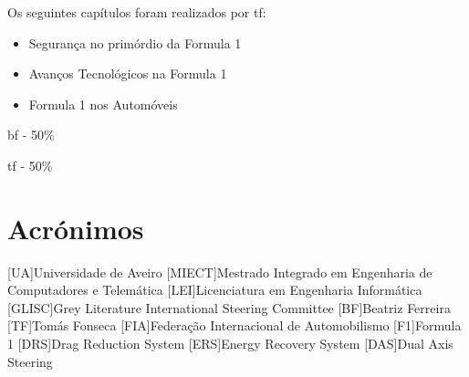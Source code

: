 \documentclass{report}
\begin{document}
Os seguintes capítulos foram realizados por \ac{tf}:
\begin{itemize}
\item Segurança no primórdio da Formula 1
\item Avanços Tecnológicos na Formula 1
\item Formula 1 nos Automóveis\\[0.5cm]
\end{itemize}

\ac{bf} - 50\%


\ac{tf} - 50\%


\chapter*{Acrónimos}
\begin{acronym}
[UA]{Universidade de Aveiro}
[MIECT]{Mestrado Integrado em Engenharia de Computadores e Telemática}
[LEI]{Licenciatura em Engenharia Informática}
[GLISC]{Grey Literature International Steering Committee}
[BF]{Beatriz Ferreira}
[TF]{Tomás Fonseca}
[FIA]{Federação Internacional de Automobilismo}
[F1]{Formula 1}
[DRS]{Drag Reduction System}
[ERS]{Energy Recovery System}
[DAS]{Dual Axis Steering}
\end{acronym}


\printbibliography
\end{document}
